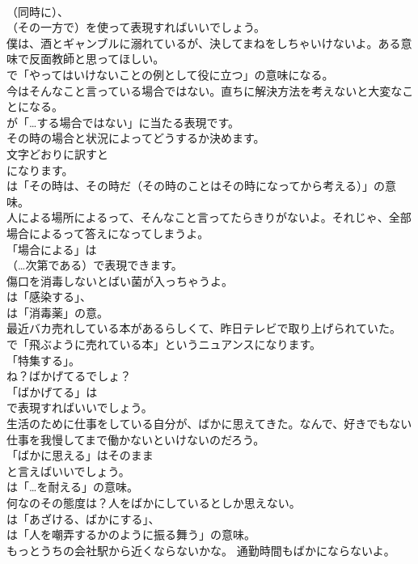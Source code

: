 \documentclass[8pt]{extreport}
\begin{document}
\begin{CJK}{UTF8}{min}
\\	（同時に）、
\\	（その一方で）を使って表現すればいいでしょう。	
\\	僕は、酒とギャンブルに溺れているが、決してまねをしちゃいけないよ。ある意味で反面教師と思ってほしい。 
\\	で「やってはいけないことの例として役に立つ」の意味になる。	
\\	今はそんなこと言っている場合ではない。直ちに解決方法を考えないと大変なことになる。 
\\	が「…する場合ではない」に当たる表現です。	
\\	その時の場合と状況によってどうするか決めます。 
\\	文字どおりに訳すと 
\\	になります。
\\	は「その時は、その時だ（その時のことはその時になってから考える）」の意味。	
\\	人による場所によるって、そんなこと言ってたらきりがないよ。それじゃ、全部場合によるって答えになってしまうよ。 
\\	「場合による」は
\\	（…次第である）で表現できます。	
\\	傷口を消毒しないとばい菌が入っちゃうよ。 
\\	は「感染する」、
\\	は「消毒薬」の意。	
\\	最近バカ売れしている本があるらしくて、昨日テレビで取り上げられていた。 
\\	で「飛ぶように売れている本」というニュアンスになります。
\\	「特集する」。	
\\	ね？ばかげてるでしょ？ 
\\	「ばかげてる」は 
\\	で表現すればいいでしょう。	
\\	生活のために仕事をしている自分が、ばかに思えてきた。なんで、好きでもない仕事を我慢してまで働かないといけないのだろう。 
\\	「ばかに思える」はそのまま 
\\	と言えばいいでしょう。
\\	は「…を耐える」の意味。	
\\	何なのその態度は？人をばかにしているとしか思えない。 
\\	は「あざける、ばかにする」、
\\	は「人を嘲弄するかのように振る舞う」の意味。	
\\	もっとうちの会社駅から近くならないかな。 通勤時間もばかにならないよ。 

\end{CJK}
\end{document}
